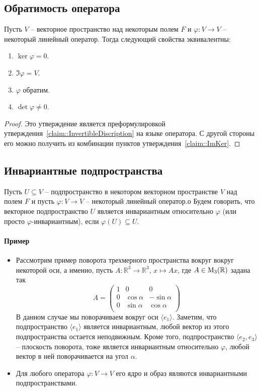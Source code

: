 \subsection{Обратимость оператора}

\begin{claim}\label{claim::OperatorInvert}
Пусть $V$ -- векторное пространство над некоторым полем $F$ и $\varphi\colon V\to V$ -- некоторый линейный оператор. Тогда следующий свойства эквивалентны:
\begin{enumerate}
\item $\ker \varphi = 0$.
\item $\Im \varphi = V$.
\item $\varphi$ обратим.
\item $\det \varphi \neq 0$.
\end{enumerate}
\end{claim}
\begin{proof}
Это утверждение является преформулировкой утверждения~\ref{claim::InvertibleDiscription} на языке оператора. С другой стороны его можно получить из комбинации пунктов утверждения~\ref{claim::ImKer}.
\end{proof}

\subsection{Инвариантные подпространства}

Пусть $U\subseteq V$ -- подпространство в некотором векторном пространстве $V$ над полем $F$ и пусть $\varphi\colon V\to V$ -- некоторый линейный оператор.о Будем говорить, что векторное подпространство $U$ является инвариантным относительно $\varphi$ (или просто $\varphi$-инвариантным), если $\varphi(U)\subseteq U$.


\paragraph{Пример}

\begin{itemize}
\item Рассмотрим пример поворота трехмерного пространства вокруг вокруг некоторой оси, а именно, пусть $A\colon \mathbb R^3 \to \mathbb R^3$, $x\mapsto Ax$, где $A\in \operatorname{M}_{3}(\mathbb R)$ задана так
\[
A = 
\begin{pmatrix}
{1}&{0}&{0}\\
{0}&{\cos \alpha}&{-\sin \alpha}\\
{0}&{\sin \alpha}&{\cos \alpha}\\
\end{pmatrix}
\]
В данном случае мы поворачиваем вокруг оси $\langle e_1 \rangle$. Заметим, что подпространство $\langle e_1\rangle$ является инвариантным, любой вектор из этого подпространства остается неподвижным. Кроме того, подпространство $\langle e_2, e_3\rangle$ -- плоскость поворота, тоже является инвариантным относительно $\varphi$, любой вектор в ней поворачивается на угол $\alpha$.

\item Для любого оператора $\varphi \colon V\to V$ его ядро и образ являются инвариантными подпространствами.
\end{itemize}

